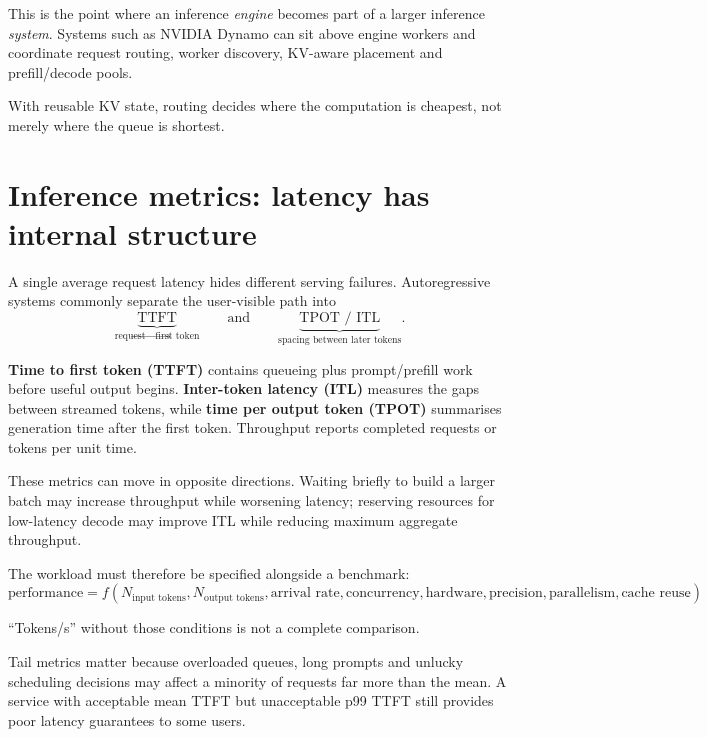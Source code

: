 This is the point where an inference \emph{engine} becomes part of a larger inference \emph{system}.
Systems such as NVIDIA Dynamo can sit above engine workers and coordinate request routing, worker discovery, KV-aware placement and prefill/decode pools.

\begin{calloutmemoryhook}
With reusable KV state, routing decides where the computation is cheapest, not merely where the queue is shortest.
\end{calloutmemoryhook}


\section{Inference metrics: latency has internal structure}
\label{sec:inference-metrics}
A single average request latency hides different serving failures.
Autoregressive systems commonly separate the user-visible path into
\[
\underbrace{\text{TTFT}}_{\text{request}\rightarrow\text{first token}}
\qquad\text{and}\qquad
\underbrace{\text{TPOT / ITL}}_{\text{spacing between later tokens}}.
\]

\textbf{Time to first token (TTFT)} contains queueing plus prompt/prefill work before useful output begins.
\textbf{Inter-token latency (ITL)} measures the gaps between streamed tokens, while \textbf{time per output token (TPOT)} summarises generation time after the first token.
Throughput reports completed requests or tokens per unit time.

These metrics can move in opposite directions.
Waiting briefly to build a larger batch may increase throughput while worsening latency; reserving resources for low-latency decode may improve ITL while reducing maximum aggregate throughput.

The workload must therefore be specified alongside a benchmark:
\[
\boxed{
\text{performance}
=
f(
N_{\text{input tokens}},
N_{\text{output tokens}},
\text{arrival rate},
\text{concurrency},
\text{hardware},
\text{precision},
\text{parallelism},
\text{cache reuse}
).
}
\]

``Tokens/s'' without those conditions is not a complete comparison.

Tail metrics matter because overloaded queues, long prompts and unlucky scheduling decisions may affect a minority of requests far more than the mean.
A service with acceptable mean TTFT but unacceptable p99 TTFT still provides poor latency guarantees to some users.

